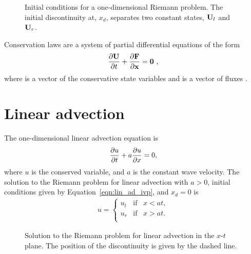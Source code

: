 \begin{figure}[htbp]\figSpace
\begin{center}

\end{center}
\caption{Initial conditions for a one-dimensional Riemann problem.  The initial discontinuity at, $x_d$, separates two constant states, $\mathbf{U}_l$ and $\mathbf{U}_r$.}
\label{fig:ivp}
\figSpace
\end{figure}

Conservation laws are a system of partial differential equations of the form   
\begin{gather*}
\frac{\partial \mathbf{U}}{\partial t} + \frac{\partial \mathbf{F}}{\partial \mathbf{x}} = \mathbf{0} \text{ ,}
\end{gather*} 
where  is a vector of the conservative state variables and  is a vector of fluxes \citep{Toro:1999}. 


\section[Linear advection]{Linear advection}
\label{sec:lin_advec}

The one-dimensional linear advection equation is 
\begin{gather}
\label{eqn:linear_ad}
\frac{\partial u}{\partial t} + a\frac{\partial u}{\partial x} = 0,
\end{gather}
where $u$ is the conserved variable, and  $a$ is the constant wave velocity.  The solution to the Riemann problem for linear advection with $a>0$, initial conditions given by Equation~\ref{eqn:lin_ad_ivp}, and $x_d = 0$ is   
\begin{gather*}
\label{eqn:lin_ad_ivp} 
u = 
\begin{cases}
u_l & \text{if}\;\;\; x < at, \\
u_r & \text{if}\;\;\; x > at. \\
\end{cases}
\end{gather*} 

\begin{figure}[htbp]\figSpace
\begin{center}

\end{center}
\caption{Solution to the Riemann problem for linear advection in the $x$-$t$ plane.  The position of the discontinuity is given by the dashed line.}
\label{fig:lin_ad_rstates}
\figSpace
\end{figure}

